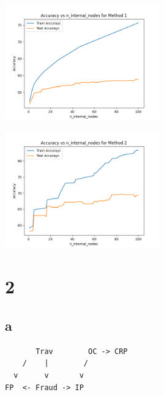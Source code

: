 \documentclass[11pt]{article}
\begin{document}
\includegraphics[width=0.5\textwidth]{Method1.png}

\includegraphics[width=0.5\textwidth]{Method2.png}

\section{2}

\subsection{a}

\begin{verbatim}
       Trav        OC -> CRP
    /    |        /
  v      v       v 
FP  <- Fraud -> IP
\end{verbatim}
\end{document}
